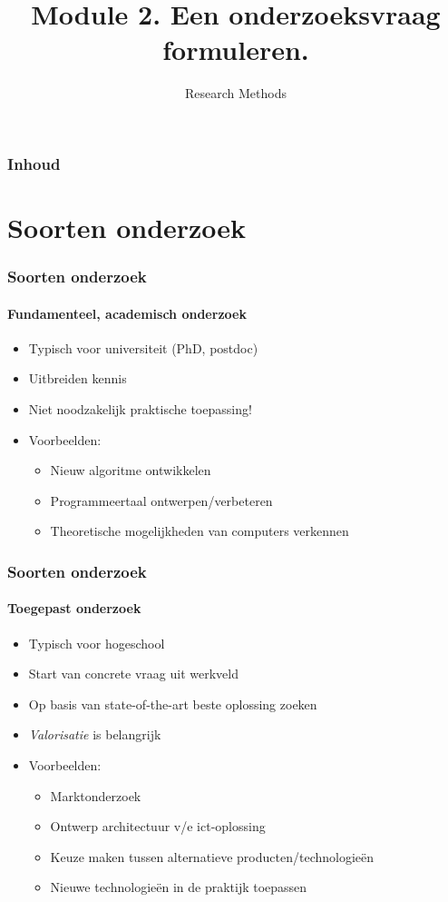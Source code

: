 \documentclass[aspectratio=169]{beamer}
\title{Module 2. Een onderzoeksvraag formuleren.}
\subtitle{Research Methods}
\author{\lecturers}   %
\date{\academicyear}
\begin{document}
\begin{frame}
  \maketitle
\end{frame}

\begin{frame}
  \frametitle{Inhoud}

  \tableofcontents
\end{frame}

\section{Soorten onderzoek}

\begin{frame}
  \frametitle{Soorten onderzoek}
  \framesubtitle{Fundamenteel, academisch onderzoek}

  \begin{itemize}
    \item Typisch voor universiteit (PhD, postdoc)
    \item Uitbreiden kennis
    \item Niet noodzakelijk praktische toepassing!
    \item Voorbeelden:
          \begin{itemize}
            \item Nieuw algoritme ontwikkelen
            \item Programmeertaal ontwerpen/verbeteren
            \item Theoretische mogelijkheden van computers verkennen
          \end{itemize}
  \end{itemize}

\end{frame}

\begin{frame}
  \frametitle{Soorten onderzoek}
  \framesubtitle{Toegepast onderzoek}

  \begin{itemize}
    \item Typisch voor hogeschool
    \item Start van concrete vraag uit werkveld
    \item Op basis van state-of-the-art beste oplossing zoeken
    \item \textit{Valorisatie} is belangrijk
    \item Voorbeelden:
          \begin{itemize}
            \item Marktonderzoek
            \item Ontwerp architectuur v/e ict-oplossing
            \item Keuze maken tussen alternatieve producten/technologieën
            \item Nieuwe technologieën in de praktijk toepassen
          \end{itemize}
  \end{itemize}

\end{frame}
\end{document}
